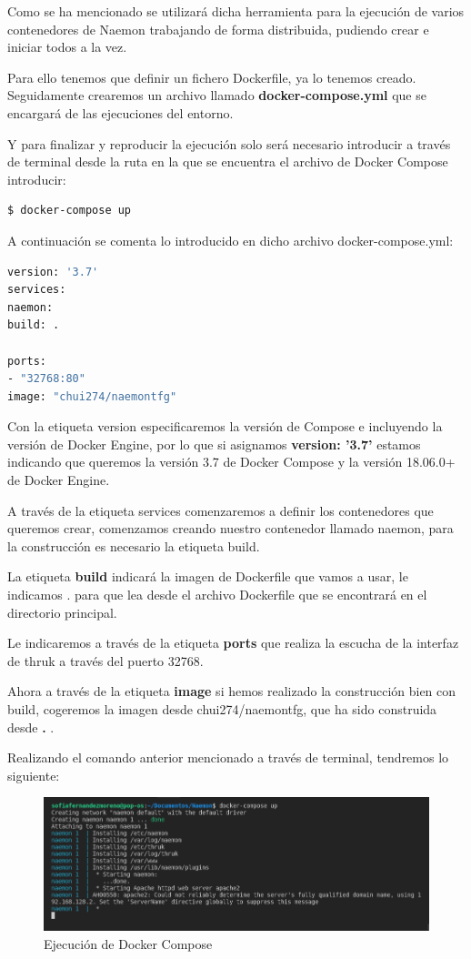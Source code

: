 Como se ha mencionado se utilizará dicha herramienta para la ejecución de varios contenedores de Naemon trabajando de forma distribuida, pudiendo crear e iniciar todos a la vez.

Para ello tenemos que definir un fichero Dockerfile, ya lo tenemos creado.
Seguidamente crearemos un archivo llamado \textbf{docker-compose.yml} que se encargará de las ejecuciones del entorno.

Y para finalizar y reproducir la ejecución solo será necesario introducir a través de terminal desde la ruta en la que se encuentra el archivo de Docker Compose introducir:

\begin{lstlisting}[language=bash]
$ docker-compose up
\end{lstlisting}
\newpage
A continuación se comenta lo introducido en dicho archivo docker-compose.yml:

\begin{lstlisting}[language=bash]
version: '3.7'
services:
naemon:
build: .

ports:
- "32768:80"
image: "chui274/naemontfg"


\end{lstlisting}

Con la etiqueta version especificaremos la versión de Compose e incluyendo la versión de Docker Engine, por lo que si asignamos \textbf{version: '3.7'} estamos indicando que queremos la versión 3.7 de Docker Compose y la versión 18.06.0+ de Docker Engine.

A través de la etiqueta services comenzaremos a definir los contenedores que queremos crear, comenzamos creando nuestro contenedor llamado naemon, para la construcción es necesario la etiqueta build.

La etiqueta \textbf{build}  indicará la imagen de Dockerfile que vamos a usar, le indicamos . para que lea desde el archivo Dockerfile que se encontrará en el directorio principal.

Le indicaremos a través de la etiqueta \textbf{ports}   que realiza la escucha de la interfaz de thruk a través del puerto 32768.

Ahora a través de la etiqueta \textbf{image}  si hemos realizado la construcción bien con build, cogeremos la imagen desde chui274/naemontfg, que ha sido construida desde \textbf{.} .

Realizando el comando anterior mencionado a través de terminal, tendremos lo siguiente:

\begin{figure}[H]
	\centering
	\includegraphics[width=1\textwidth]{imagenes/despliegue_naemon/terminal.png}
	\caption{Ejecución de Docker Compose} \label{dockercompose}
\end{figure}

